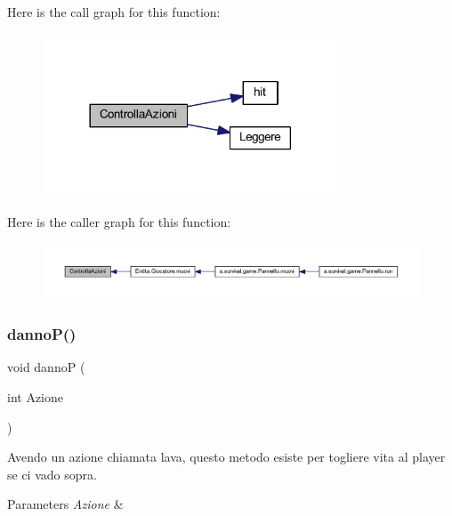 Here is the call graph for this function\+:
\nopagebreak
\begin{figure}[H]
\begin{center}
\leavevmode
\includegraphics[width=249pt]{classa_1_1survival_1_1game_1_1_azioni_a39753d0160b9846cd1dd3d4556519456_cgraph}
\end{center}
\end{figure}
Here is the caller graph for this function\+:
\nopagebreak
\begin{figure}[H]
\begin{center}
\leavevmode
\includegraphics[width=350pt]{classa_1_1survival_1_1game_1_1_azioni_a39753d0160b9846cd1dd3d4556519456_icgraph}
\end{center}
\end{figure}
\mbox{\label{classa_1_1survival_1_1game_1_1_azioni_ac1ebef3669e998cab686d462e5bdea24}} 
\subsubsection{\texorpdfstring{danno\+P()}{dannoP()}}
{\footnotesize\ttfamily void dannoP (\begin{DoxyParamCaption}\item[{int}]{Azione }\end{DoxyParamCaption})}



Avendo un azione chiamata lava, questo metodo esiste per togliere vita al player se ci vado sopra. 


\begin{DoxyParams}{Parameters}
{\em Azione} & \\
\hline
\end{DoxyParams}


